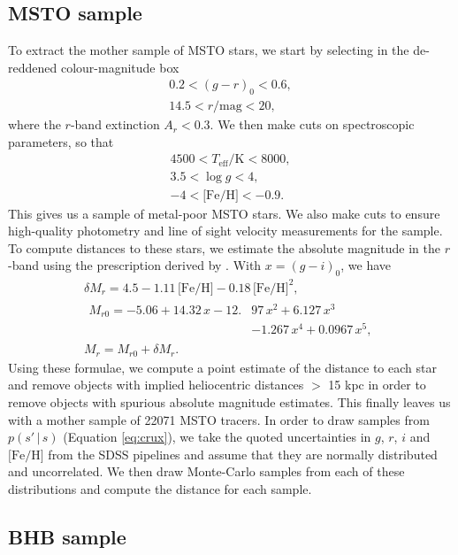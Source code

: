\documentclass[useAMS,twocolumn,usenatbib]{mn2e}
\begin{document}
\subsection{MSTO sample}

To extract the mother sample of MSTO stars, we start by selecting in the de-reddened colour-magnitude box
%
\begin{gather}
0.2 < (g-r)_0 < 0.6, \nonumber \\
14.5 < r/\mathrm{mag} < 20,
\end{gather}
%
where the $r$-band extinction $A_r<0.3$. We then make cuts on spectroscopic parameters, so that
%
\begin{gather}
4500 < T_{\mathrm{eff}}/\mathrm{K} < 8000, \nonumber \\
3.5 < \log g < 4, \nonumber \\
-4 < \mathrm{\lbrack Fe/H \rbrack} < -0.9.
\end{gather}
% 
This gives us a sample of metal-poor MSTO stars. 
We also make cuts to ensure high-quality photometry and line of sight velocity measurements for the sample. 
To compute distances to these stars, we estimate the absolute magnitude in the $r$-band using the prescription derived by \cite{Iv08}. 
With $x=(g-i)_0$, we have
%
\begin{gather}
\delta M_r = 4.5 - 1.11\,\lbrack \mathrm{Fe/H} \rbrack -0.18\,\lbrack \mathrm{Fe/H} \rbrack^2, \nonumber \\
\begin{split}
M_{r0} = -5.06 + 14.32\,x - 12.{}&97\,x^2 + 6.127\,x^3 \nonumber \\
                    {}&- 1.267\,x^4 + 0.0967\,x^5,
\end{split}\\
M_r = M_{r0} + \delta M_r.
\end{gather}
% 
Using these formulae, we compute a point estimate of the distance to each star and remove objects with implied heliocentric distances $>$ 15 kpc in order to remove objects with spurious absolute magnitude estimates.
This finally leaves us with a mother sample of 22071 MSTO tracers. 
In order to draw samples from $p(s' \,|\, s)$ (Equation \ref{eq:crux}), we take the quoted uncertainties in $g$, $r$, $i$ and $\lbrack \mathrm{Fe/H} \rbrack$ from the SDSS pipelines and assume that they are normally distributed and uncorrelated. 
We then draw Monte-Carlo samples from each of these distributions and compute the distance for each sample.

\subsection{BHB sample}
\end{document}
